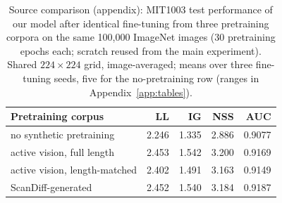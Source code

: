 \begin{table}[t]
  \centering
  \small
  \begin{tabular}{lrrrr}
    \toprule
    Pretraining corpus & LL & IG & NSS & AUC \\
    \midrule
    no synthetic pretraining & 2.246 & 1.335 & 2.886 & 0.9077 \\
    active vision, full length & 2.453 & 1.542 & 3.200 & 0.9169 \\
    active vision, length-matched & 2.402 & 1.491 & 3.163 & 0.9149 \\
    ScanDiff-generated & 2.452 & 1.540 & 3.184 & 0.9187 \\
    \bottomrule
  \end{tabular}
  \caption{Source comparison (appendix): MIT1003 test performance of our model after identical fine-tuning from three pretraining corpora on the same 100,000 ImageNet images (30 pretraining epochs each; scratch reused from the main experiment). Shared $224\times224$ grid, image-averaged; means over three fine-tuning seeds, five for the no-pretraining row (ranges in Appendix~\ref{app:tables}).}
  \label{tab:triangle}
\end{table}
